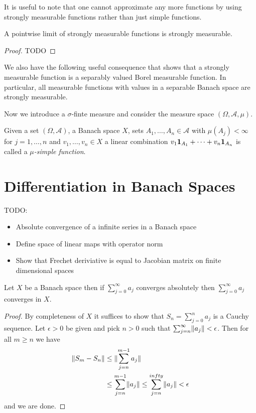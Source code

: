 It is useful to note that one cannot approximate any more functions by
using strongly measurable functions rather than just simple functions.
\begin{cor}A pointwise limit of strongly measurable functions is strongly measurable.
\end{cor}
\begin{proof}
TODO
\end{proof}

We also have the following useful consequence that shows that a
strongly measurable function is a separably valued Borel measurable
function.  In particular, all measurable functions with values in a
separable Banach space are strongly measurable.

Now we introduce a $\sigma$-finte measure and consider the measure
space $(\Omega, \mathcal{A}, \mu)$.  
\begin{defn}Given a set $(\Omega, \mathcal{A})$, a Banach space $X$,
  sets $A_1, \dotsc, A_n \in \mathcal{A}$ with $\mu(A_j) < \infty$ for
  $j=1, \dotsc, n$ and $v_1, \dotsc, v_n \in X$ a
  linear combination $v_1
  \textbf{1}_{A_1} + \cdots + v_n \textbf{1}_{A_n}$ is called
  a \emph{$\mu$-simple function}.
\end{defn}

\section{Differentiation in Banach Spaces}

TODO:
\begin{itemize}
\item Absolute convergence of a infinite series in a Banach space
\item Define space of linear maps with operator norm
\item Show that Frechet deriviative is equal to Jacobian matrix on
  finite dimensional spaces
\end{itemize}

\begin{prop}Let $X$ be a Banach space then if $\sum_{j=0}^\infty a_j$
  converges absolutely then $\sum_{j=0}^\infty a_j$ converges in $X$.
\end{prop}
\begin{proof}
By completeness of $X$ it suffices to show that $S_n = \sum_{j=0}^n
a_j$ is a Cauchy sequence.  Let $\epsilon > 0$ be given and pick $n >
0$ such that $\sum_{j=n}^\infty \lVert a_j \rVert < \epsilon$.  Then for all
$m \geq n$ we have
\begin{align*}
\lVert S_m - S_n \rVert &\leq \lVert \sum_{j=n}^{m-1} a_j \rVert \\
&\leq \sum_{j=n}^{m-1}\lVert  a_j \rVert \leq \sum_{j=n}^{infty}\lVert  a_j \rVert < \epsilon
\end{align*}
and we are done.
\end{proof}


